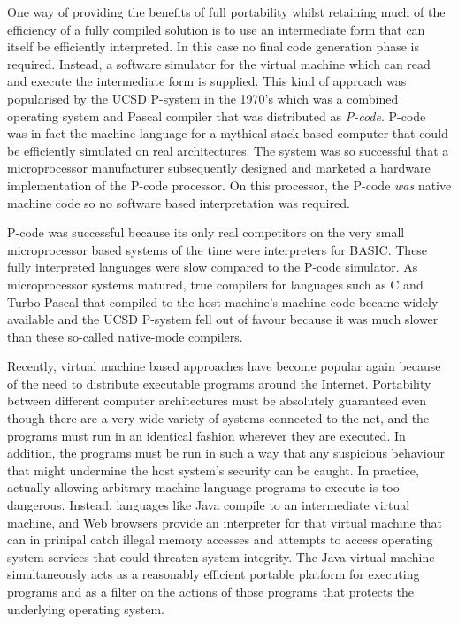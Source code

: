 One way of providing the benefits of full portability whilst retaining
much of the efficiency of a fully compiled solution is to use an
intermediate form that can itself be efficiently interpreted. In this
case no final code generation phase is required. Instead, a software simulator
for the virtual machine which can read and execute the intermediate form
is supplied. This kind of approach was popularised by the UCSD P-system
in the 1970's which was a combined operating system and Pascal compiler
that was distributed as {\em P-code}. P-code~\cite{PEMBERTON82a,PEMBERTON82b} 
was in fact the machine
language for a mythical stack based computer that could be efficiently
simulated on real architectures. The system was so successful that a
microprocessor manufacturer subsequently designed and marketed a
hardware implementation of the P-code processor. On this processor, the
P-code {\em was} native machine code so no software based interpretation
was required. 

P-code was successful because its only real competitors on the very
small microprocessor based systems of the time were interpreters for
BASIC. These fully interpreted languages were slow compared to the
P-code simulator. As microprocessor systems matured, true compilers for
languages such as C and Turbo-Pascal that compiled to the host machine's
machine code became widely available and the UCSD P-system fell out of
favour because it was much slower than these so-called native-mode compilers.

Recently, virtual machine based approaches have become popular again
because of the need to distribute executable programs around the
Internet. Portability between different computer architectures must be
absolutely guaranteed even though there are a very wide variety of
systems connected to the net, and the programs must run in an identical
fashion wherever they are executed. In addition, the programs must be
run in such a way that any suspicious behaviour that might undermine the
host system's security can be caught. In practice, actually allowing
arbitrary machine language programs to execute is too dangerous.
Instead, languages like Java compile to an intermediate virtual machine,
and Web browsers provide an interpreter for that virtual machine that
can in prinipal catch illegal memory accesses and attempts to access
operating system services that could threaten system integrity. The Java
virtual machine simultaneously acts as a reasonably efficient portable
platform for executing programs and as a filter on the actions of those
programs that protects the underlying operating system.

